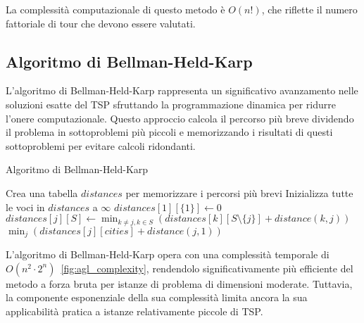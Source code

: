 La complessità computazionale di questo metodo è $O(n!)$, che riflette il numero fattoriale di tour che devono essere valutati.

\subsection{Algoritmo di Bellman-Held-Karp}

L'algoritmo di Bellman-Held-Karp rappresenta un significativo avanzamento nelle soluzioni esatte del \gls{TSP} sfruttando la programmazione dinamica per ridurre l'onere computazionale. Questo approccio calcola il percorso più breve dividendo il problema in sottoproblemi più piccoli e memorizzando i risultati di questi sottoproblemi per evitare calcoli ridondanti.

\begin{algorithm}
	\caption{Algoritmo di Bellman-Held-Karp}\label{bellmanheldkarp}
	\begin{algorithmic}[1]
		\State Crea una tabella $distances$ per memorizzare i percorsi più brevi
		\State Inizializza tutte le voci in $distances$ a $\infty$
		\State $distances[1][\{1\}] \gets 0$ 
		\State $distances[j][S] \gets \min_{k \neq j, k \in S} (distances[k][S\setminus\{j\}] + distance(k, j))$
		\EndFor
		\EndFor
		\EndFor
		\State \Return $\min_{j}(distances[j][cities] + distance(j, 1))$
		\EndProcedure
	\end{algorithmic}
\end{algorithm}

L'algoritmo di Bellman-Held-Karp opera con una complessità temporale di $O(n^2 \cdot 2^n)$~\ref{fig:agl_complexity}, rendendolo significativamente più efficiente del metodo a forza bruta per istanze di problema di dimensioni moderate. Tuttavia, la componente esponenziale della sua complessità limita ancora la sua applicabilità pratica a istanze relativamente piccole di \gls{TSP}.



